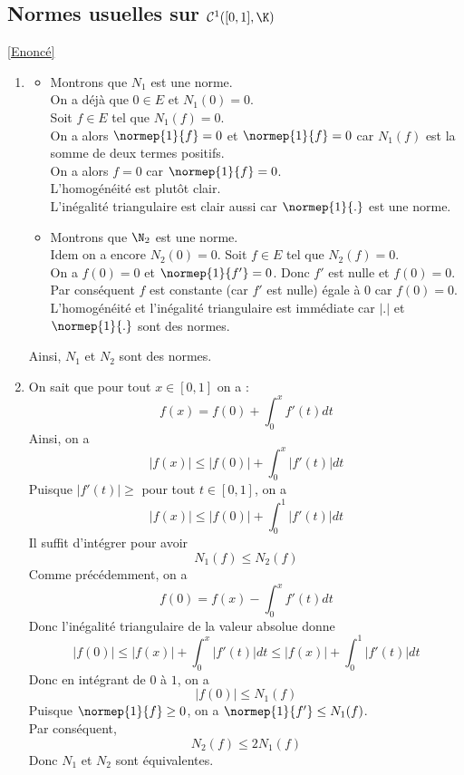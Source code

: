 \documentclass{book}
\begin{document}
		\subsection{Normes usuelles sur $\mathcal{C}^1([0,1],\K)$}\label{sec:normes-usuelles-sur-mathcalc101k}
			\textcolor{blue}{\hyperref[Normes usuelles sur C1]{[Enoncé]}}\\
	\begin{enumerate}[leftmargin=*]
		\item \begin{itemize}
			\item Montrons que $N_1$ est une norme.\\
			\textbullet On a déjà que $0\in E$ et $N_1(0)=0$.\\
			Soit $f\in E$ tel que $N_1(f)=0$.\\
			On a alors $\normep{1}{f}=0$ et $\normep{1}{f}=0$ car $N_1(f)$ est la somme de deux termes positifs.\\
			On a alors $f=0$ car $\normep{1}{f}=0$.\\
			\textbullet L'homogénéité est plutôt clair.\\
			\textbullet L'inégalité triangulaire est clair aussi car $\normep{1}{.}$ est une norme.
		\item Montrons que $\N_2$ est une norme.\\
			\textbullet Idem on a encore $N_2(0)=0$.
			Soit $f\in E$ tel que $N_2(f)=0$.\\
			On a $f(0)=0$ et $\normep{1}{f'}=0$.
			Donc $f'$ est nulle et $f(0)=0$.\\
			Par conséquent $f$ est constante (car $f'$ est nulle) égale à $0$ car $f(0)=0$.\\
			\textbullet L'homogénéité et l'inégalité triangulaire est immédiate car $|.|$ et $\normep{1}{.}$ sont des normes.
		\end{itemize}
		Ainsi, $N_1$ et $N_2$ sont des normes.
		\item On sait que pour tout $x\in[0,1]$ on a :
		\[f(x)=f(0)+\int_{0}^{x}f'(t)dt\]
		Ainsi, on a 
		\[|f(x)|\leq |f(0)|+\int_{0}^{x}|f'(t)|dt\]
		Puisque $|f'(t)|\geq $ pour tout $t\in [0,1]$, on a 
		\[|f(x)|\leq |f(0)|+\int_{0}^{1}|f'(t)|dt\]
		Il suffit d'intégrer pour avoir 
		\[N_1(f)\leq N_2(f)\]
		Comme précédemment, on a
		\[f(0)=f(x)-\int_{0}^{x}f'(t)dt\]
		Donc l'inégalité triangulaire de la valeur absolue donne 
		\[|f(0)|\leq |f(x)|+\int_{0}^{x}|f'(t)|dt\leq |f(x)|+\int_{0}^{1}|f'(t)|dt\]
		Donc en intégrant de $0$ à $1$, on a 
		\[|f(0)|\leq N_1(f)\]
		Puisque $\normep{1}{f}\geq 0$, on a $\normep{1}{f'}\leq N_1(f)$.\\
		Par conséquent, \[N_2(f)\leq 2N_1(f)\]
		Donc $N_1$ et $N_2$ sont équivalentes.
	\end{enumerate}
\end{document}

